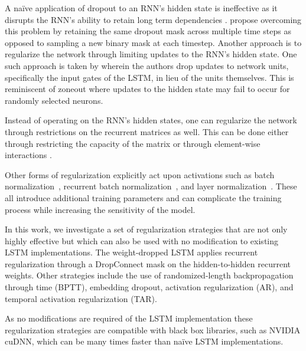\documentclass{article}
\begin{document}
A na\"ive application of dropout \cite{Srivastava2014DropoutAS} to an RNN's hidden state is ineffective as it disrupts the RNN's ability to retain long term dependencies \cite{Zaremba2014}.
\citet{Gal2016ATG} propose overcoming this problem by retaining the same dropout mask across multiple time steps as opposed to sampling a new binary mask at each timestep.
Another approach is to regularize the network through limiting updates to the RNN's hidden state.
One such approach is taken by \citet{Semeniuta2016RecurrentDW} wherein the authors drop updates to network units, specifically the input gates of the LSTM, in lieu of the units themselves.
This is reminiscent of zoneout \citep{Krueger2016} where updates to the hidden state may fail to occur for randomly selected neurons.

Instead of operating on the RNN's hidden states, one can regularize the network through restrictions on the recurrent matrices as well.
This can be done either through restricting the capacity of the matrix \citep{Arjovsky2016, Wisdom2016, Jing2016} or through element-wise interactions \citep{Balduzzi2016,Bradbury2016,Seo2016}.

Other forms of regularization explicitly act upon activations such as batch normalization~\citep{Ioffe2015BatchNA}, recurrent batch normalization~\citep{Cooijmans2016RecurrentBN}, and layer normalization~\citep{Ba2016LayerN}.
These all introduce additional training parameters and can complicate the training process while increasing the sensitivity of the model.

In this work, we investigate a set of regularization strategies that are not only highly effective but which can also be used with no modification to existing LSTM implementations.
The weight-dropped LSTM applies recurrent regularization through a DropConnect mask on the hidden-to-hidden recurrent weights.
Other strategies include the use of randomized-length backpropagation through time (BPTT), embedding dropout, activation regularization (AR), and temporal activation regularization (TAR).

As no modifications are required of the LSTM implementation these regularization strategies are compatible with black box libraries, such as NVIDIA cuDNN, which can be many times faster than na\"ive LSTM implementations.
\end{document}
